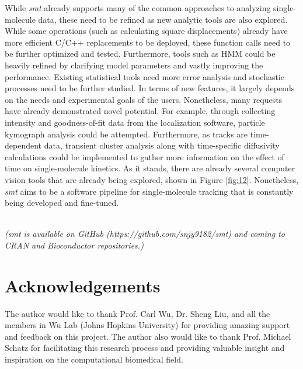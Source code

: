 \documentclass{bioinfo}
\begin{document}
While \textit{smt} already supports many of the common approaches to analyzing single-molecule data, these need to be refined as new analytic tools are also explored. While some operations (such as calculating square displacements) already have more efficient C/C++ replacements to be deployed, these function calls need to be further optimized and tested. Furthermore, tools such as HMM could be heavily refined by clarifying model parameters and vastly improving the performance. Existing statistical tools need more error analysis and stochastic processes need to be further studied. In terms of new features, it largely depends on the needs and experimental goals of the users. Nonetheless, many requests have already demonstrated novel potential. For example, through collecting intensity and goodness-of-fit data from the localization software, particle kymograph analysis could be attempted. Furthermore, as tracks are time-dependent data, transient cluster analysis along with time-specific diffusivity calculations could be implemented to gather more information on the effect of time on single-molecule kinetics. As it stands, there are already several computer vision tools that are already being explored, shown in Figure \ref{fig:12}. Nonetheless, \textit{smt} aims to be a software pipeline for single-molecule tracking that is constantly being developed and fine-tuned.
\\ \\
\raggedright{\textit{\footnotesize{(\textit{smt} is available on GitHub (https://github.com/snjy9182/smt) and coming to CRAN and Bioconductor repositories.)}}}


\section*{Acknowledgements}

The author would like to thank Prof. Carl Wu, Dr. Sheng Liu, and all the members in Wu Lab (Johns Hopkins University) for providing amazing support and feedback on this project. The author also would like to thank Prof. Michael Schatz for facilitating this research process and providing valuable insight and inspiration on the computational biomedical field.

\end{document}
